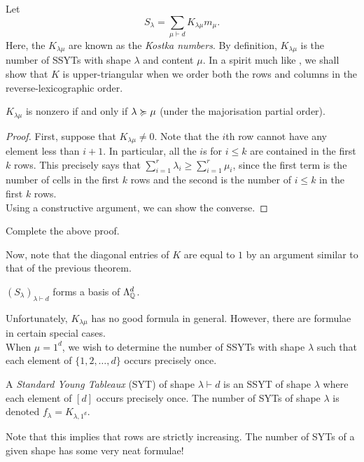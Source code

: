 	Let
	\begin{equation}
		\label{eqn: kostka}
		S_\lambda = \sum_{\mu \vdash d} K_{\lambda\mu} m_\mu.
	\end{equation}
	Here, the $K_{\lambda\mu}$ are known as the \emph{Kostka numbers}. By definition, $K_{\lambda\mu}$ is the number of SSYTs with shape $\lambda$ and content $\mu$. In a spirit much like , we shall show that $K$ is upper-triangular when we order both the rows and columns in the reverse-lexicographic order.

	\begin{ftheo}
		$K_{\lambda\mu}$ is nonzero if and only if $\lambda \succcurlyeq \mu$ (under the majorisation partial order).
	\end{ftheo}
	\begin{proof}
		First, suppose that $K_{\lambda\mu} \ne 0$. Note that the $i$th row cannot have any element less than $i+1$. In particular, all the $i$s for $i\le k$ are contained in the first $k$ rows. This precisely says that $\sum_{i=1}^r \lambda_i \ge \sum_{i=1}^r \mu_i$, since the first term is the number of cells in the first $k$ rows and the second is the number of $i \le k$ in the first $k$ rows.\\
		Using a constructive argument, we can show the converse.
	\end{proof}

	\begin{exercise}
		Complete the above proof.
	\end{exercise}

	Now, note that the diagonal entries of $K$ are equal to $1$ by an argument similar to that of the previous theorem.
	\begin{fcor}
		$(S_\lambda)_{\lambda \vdash d}$ forms a basis of $\Lambda_{\mathbb{Q}}^d$. 
	\end{fcor}

	Unfortunately, $K_{\lambda\mu}$ has no good formula in general. However, there are formulae in certain special cases.\\
	When $\mu = 1^d$, we wish to determine the number of SSYTs with shape $\lambda$ such that each element of $\{1,2,\ldots,d\}$ occurs precisely once.

	\begin{fdef}
		A \emph{Standard Young Tableaux} (SYT) of shape $\lambda\vdash d$ is an SSYT of shape $\lambda$ where each element of $[d]$ occurs precisely once. The number of SYTs of shape $\lambda$ is denoted $f_\lambda = K_{\lambda,1^d}$.
	\end{fdef}
	Note that this implies that rows are strictly increasing. The number of SYTs of a given shape has some very neat formulae!


